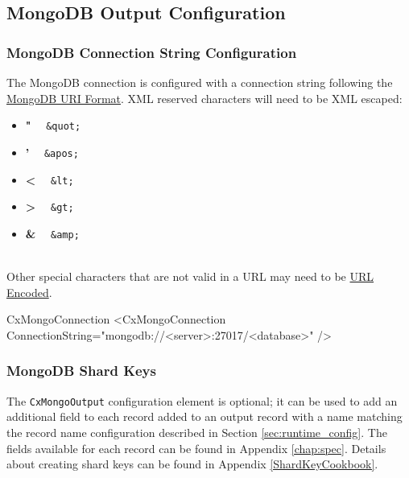 \subsection{MongoDB Output Configuration}


\subsubsection{MongoDB Connection String Configuration}

The MongoDB connection is configured with a connection string following the \href{https://docs.mongodb.com/manual/reference/connection-string/}{MongoDB URI Format}.
XML reserved characters will need to be XML escaped:

\begin{itemize}
    \item \textbf{"} \ \faArrowRight \ \texttt{\&quot;}
    \item \textbf{'} \ \faArrowRight \ \texttt{\&apos;}
    \item \textbf{<} \ \faArrowRight \ \texttt{\&lt;}
    \item \textbf{>} \ \faArrowRight \ \texttt{\&gt;}
    \item \textbf{\&} \ \faArrowRight \ \texttt{\&amp;}
\end{itemize}

\noindent\\Other special characters that are not valid in a URL may need to be \href{https://www.w3schools.com/tags/ref_urlencode.ASP}{URL Encoded}.\\

\begin{xml}{CxMongoConnection}{\expandsenv\encrypts}{}
<CxMongoConnection
    ConnectionString="mongodb://<server>:27017/<database>"
/>
\end{xml}

\subsubsection{MongoDB Shard Keys}

The \texttt{CxMongoOutput} configuration element is optional; it can be used to add an additional field to each record
added to an output record with a name matching the record name configuration described in Section \ref{sec:runtime_config}.  The fields
available for each record can be found in Appendix \ref{chap:spec}. Details about creating shard keys can be found in Appendix \ref{ShardKeyCookbook}.

